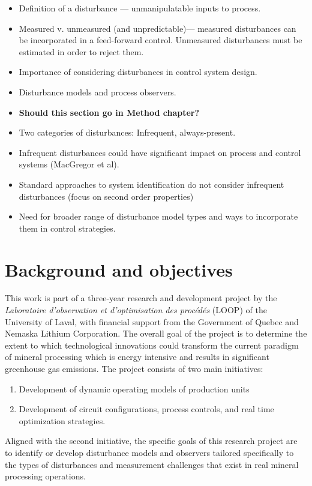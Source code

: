 \begin{itemize}
	\item Definition of a disturbance — unmanipulatable inputs to process.
	\item Measured v. unmeasured (and unpredictable)— measured disturbances can be incorporated in a feed-forward control.  Unmeasured disturbances must be estimated in order to reject them.
	\item Importance of considering disturbances in control system design.
	\item Disturbance models and process observers.
	\item \textbf{Should this section go in Method chapter?}
	\item Two categories of disturbances: Infrequent, always-present.
	\item Infrequent disturbances could have significant impact on process and control systems (MacGregor et al).
	\item Standard approaches to system identification do not consider infrequent disturbances (focus on second order properties)
	\item Need for broader range of disturbance model types and ways to incorporate them in control strategies.
\end{itemize}

\section*{Background and objectives}

This work is part of a three-year research and development project by the \textit{Laboratoire d’observation et d’optimisation des procédés} (LOOP) of the University of Laval, with financial support from the Government of Quebec and Nemaska Lithium Corporation. The overall goal of the project is to determine the extent to which technological innovations could transform the current paradigm of mineral processing which is energy intensive and results in significant greenhouse gas emissions. The project consists of two main initiatives:

\begin{enumerate}
	\item Development of dynamic operating models of production units
	\item Development of circuit configurations, process controls, and real time optimization strategies.
\end{enumerate}

Aligned with the second initiative, the specific goals of this research project are to identify or develop disturbance models and observers tailored specifically to the types of disturbances and measurement challenges that exist in real mineral processing operations.

